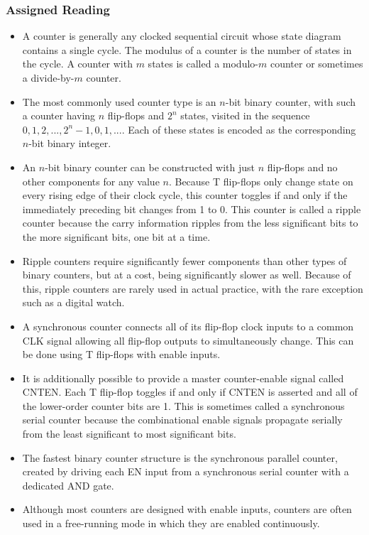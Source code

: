 \documentclass[10pt,a4paper]{article}
\begin{document}
\subsubsection{Assigned Reading}
\begin{itemize}
\item A counter is generally any clocked sequential circuit whose state diagram contains a single cycle. The modulus of a counter is the number of states in the cycle. A counter with $m$ states is called a modulo-$m$ counter or sometimes a divide-by-$m$ counter. 
\item The most commonly used counter type is an $n$-bit binary counter, with such a counter having $n$ flip-flops and $2^n$ states, visited in the sequence $0, 1, 2, ..., 2^n-1, 0, 1, ...$. Each of these states is encoded as the corresponding $n$-bit binary integer.
\item An $n$-bit binary counter can be constructed with just $n$ flip-flops and no other components for any value $n$. Because T flip-flops only change state on every rising edge of their clock cycle, this counter toggles if and only if the immediately preceding bit changes from 1 to 0. This counter is called a ripple counter because the carry information ripples from the less significant bits to the more significant bits, one bit at a time. 
\item Ripple counters require significantly fewer components than other types of binary counters, but at a cost, being significantly slower as well. Because of this, ripple counters are rarely used in actual practice, with the rare exception such as a digital watch. 
\item A synchronous counter connects all of its flip-flop clock inputs to a common CLK signal allowing all flip-flop outputs to simultaneously change. This can be done using T flip-flops with enable inputs. 
\item It is additionally possible to provide a master counter-enable signal called CNTEN. Each T flip-flop toggles if and only if CNTEN is asserted and all of the lower-order counter bits are 1. This is sometimes called a synchronous serial counter because the combinational enable signals propagate serially from the least significant to most significant bits. 
\item The fastest binary counter structure is the synchronous parallel counter, created by driving each EN input from a synchronous serial counter with a dedicated AND gate.
\item Although most counters are designed with enable inputs, counters are often used in a free-running mode in which they are enabled continuously. 

\end{itemize}
\end{document}
